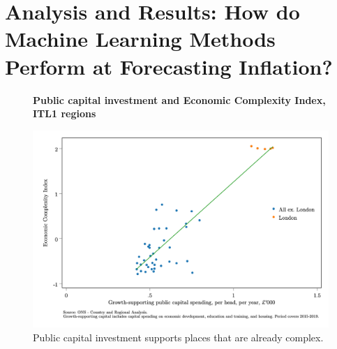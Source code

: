 \pagebreak
\section{Analysis and Results: How do Machine Learning Methods Perform at Forecasting Inflation?} \label{sec:analysis}


\begin{figure}
    \centering
    \textbf{Public capital investment and Economic Complexity Index, ITL1 regions} \par\medskip
    \includegraphics[width=1\linewidth]{figures/public_capitalspend_eci.png}
    \vspace{-30pt}
    \caption[Public capital investment and Economic Complexity Index, ITL1 regions]{Public capital investment supports places that are already complex.}
    \label{fig:public_capitalspend_eci} 
\end{figure}


